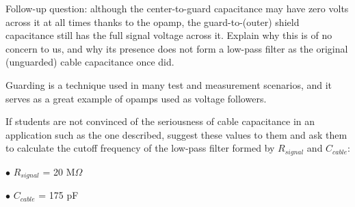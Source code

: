 \vskip 10pt

Follow-up question: although the center-to-guard capacitance may have zero volts across it at all times thanks to the opamp, the guard-to-(outer) shield capacitance still has the full signal voltage across it.  Explain why this is of no concern to us, and why its presence does not form a low-pass filter as the original (unguarded) cable capacitance once did.







Guarding is a technique used in many test and measurement scenarios, and it serves as a great example of opamps used as voltage followers.

If students are not convinced of the seriousness of cable capacitance in an application such as the one described, suggest these values to them and ask them to calculate the cutoff frequency of the low-pass filter formed by $R_{signal}$ and $C_{cable}$:

\medskip
\goodbreak
\item{$\bullet$} $R_{signal}$ = 20 M$\Omega$
\item{$\bullet$} $C_{cable}$ = 175 pF
\medskip




